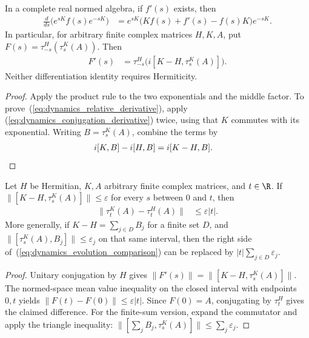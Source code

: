 \begin{lemma}
    \label{lem:dynamics_relative_derivative}
    \leanok
    In a complete real normed algebra, if $f'(s)$ exists, then
    \begin{align}
        \label{eq:dynamics_conjugation_derivative}
        \frac{d}{ds}\bigl(e^{sK}f(s)e^{-sK}\bigr)
        &=e^{sK}\bigl(Kf(s)+f'(s)-f(s)K\bigr)e^{-sK}.
    \end{align}
    In particular, for arbitrary finite complex matrices $H,K,A$, put
    $F(s)=\tau^H_{-s}(\tau^K_s(A))$. Then
    \begin{align}
        \label{eq:dynamics_relative_derivative}
        F'(s)&=\tau^H_{-s}\bigl(i[K-H,\tau^K_s(A)]\bigr).
    \end{align}
    Neither differentiation identity requires Hermiticity.
\end{lemma}
\begin{proof}\leanok
    Apply the product rule to the two exponentials and the middle factor.
    To prove~(\ref{eq:dynamics_relative_derivative}), apply
    (\ref{eq:dynamics_conjugation_derivative}) twice, using that $K$
    commutes with its exponential. Writing $B=\tau^K_s(A)$, combine the terms by
    \begin{align}
        i[K,B]-i[H,B]&=i[K-H,B].\notag
    \end{align}
\end{proof}

\begin{theorem}
    \label{thm:dynamics_hamiltonian_comparison}
    \leanok
    Let $H$ be Hermitian, $K,A$ arbitrary finite complex matrices, and $t\in\R$.
    If $\|[K-H,\tau^K_s(A)]\|\leq\varepsilon$ for every $s$ between $0$ and $t$,
    then
    \begin{align}
        \label{eq:dynamics_evolution_comparison}
        \|\tau^K_t(A)-\tau^H_t(A)\|&\leq\varepsilon |t|.
    \end{align}
    More generally, if $K-H=\sum_{j\in D}B_j$ for a finite set $D$, and
    $\|[\tau^K_s(A),B_j]\|\leq\varepsilon_j$ on that same interval, then
    the right side of~(\ref{eq:dynamics_evolution_comparison}) can be replaced by $|t|\sum_{j\in D}\varepsilon_j$.
\end{theorem}
\begin{proof}\leanok
    Unitary conjugation by $H$ gives
    $\|F'(s)\|=\|[K-H,\tau^K_s(A)]\|$.
    The normed-space mean value inequality on the closed interval with
    endpoints $0,t$ yields $\|F(t)-F(0)\|\leq\varepsilon|t|$.
    Since $F(0)=A$, conjugating by $\tau^H_t$ gives the claimed difference.
    For the finite-sum version, expand the commutator and apply the triangle
    inequality: $\|[\sum_j B_j,\tau^K_s(A)]\|\leq\sum_j\varepsilon_j$.
\end{proof}

